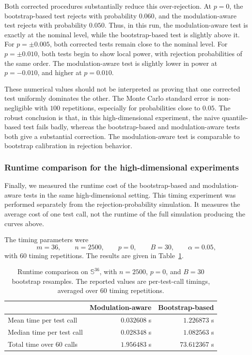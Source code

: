 \documentclass{amsart}
\theoremstyle{definition}
\theoremstyle{remark}
\newcommand\0{\boldsymbol{0}}
\begin{document}
Both corrected procedures substantially reduce this over-rejection. At \(p=0\), the bootstrap-based test rejects with probability \(0.060\), and the modulation-aware test rejects with probability \(0.050\). Thus, in this run, the modulation-aware test is exactly at the nominal level, while the bootstrap-based test is slightly above it. For \(p=\pm 0.005\), both corrected tests remain close to the nominal level. For \(p=\pm 0.010\), both tests begin to show local power, with rejection probabilities of the same order. The modulation-aware test is slightly lower in power at \(p=-0.010\), and higher at \(p=0.010\).

These numerical values should not be interpreted as proving that one corrected test uniformly dominates the other. The Monte Carlo standard error is non-negligible with \(100\) repetitions, especially for probabilities close to \(0.05\). The robust conclusion is that, in this high-dimensional experiment, the naive quantile-based test fails badly, whereas the bootstrap-based and modulation-aware tests both give a substantial correction. The modulation-aware test is comparable to bootstrap calibration in rejection behavior.

\subsubsection{Runtime comparison for the high-dimensional experiments}
\label{subsec:runtime-comparison}

Finally, we measured the runtime cost of the bootstrap-based and modulation-aware tests in the same high-dimensional setting. This timing experiment was performed separately from the rejection-probability simulation. It measures the average cost of one test call, not the runtime of the full simulation producing the curves above.

The timing parameters were
\[
m=36,\qquad n=2500,\qquad p=0,\qquad B=30,\qquad \alpha=0.05,
\]
with \(60\) timing repetitions. The results are given in Table~\ref{tab:runtime}.

\begin{table}[H]
\centering
\caption{Runtime comparison on \(\mathbb S^{36}\), with \(n=2500\), \(p=0\), and \(B=30\) bootstrap resamples. The reported values are per-test-call timings, averaged over \(60\) timing repetitions.}
\label{tab:runtime}
\begin{tabular}{lrr}
\toprule
 & Modulation-aware & Bootstrap-based \\
\midrule
Mean time per test call      & \(0.032608\) s & \(1.226873\) s \\
Median time per test call    & \(0.028348\) s & \(1.082563\) s \\
Total time over 60 calls     & \(1.956483\) s & \(73.612367\) s \\
\bottomrule
\end{tabular}
\end{table}
\end{document}
